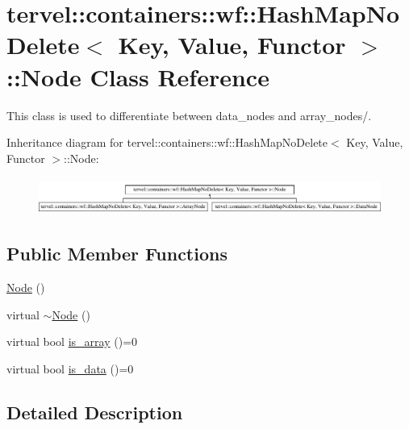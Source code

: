 \hypertarget{classtervel_1_1containers_1_1wf_1_1_hash_map_no_delete_1_1_node}{}\section{tervel\+:\+:containers\+:\+:wf\+:\+:Hash\+Map\+No\+Delete$<$ Key, Value, Functor $>$\+:\+:Node Class Reference}
\label{classtervel_1_1containers_1_1wf_1_1_hash_map_no_delete_1_1_node}


This class is used to differentiate between data\+\_\+nodes and array\+\_\+nodes/.  


Inheritance diagram for tervel\+:\+:containers\+:\+:wf\+:\+:Hash\+Map\+No\+Delete$<$ Key, Value, Functor $>$\+:\+:Node\+:\begin{figure}[H]
\begin{center}
\leavevmode
\includegraphics[height=1.222707cm]{classtervel_1_1containers_1_1wf_1_1_hash_map_no_delete_1_1_node}
\end{center}
\end{figure}
\subsection*{Public Member Functions}
\begin{DoxyCompactItemize}
\item 
\hyperlink{classtervel_1_1containers_1_1wf_1_1_hash_map_no_delete_1_1_node_ad277ea9a398c9bf518b986fdd7efd46e}{Node} ()
\item 
virtual \hyperlink{classtervel_1_1containers_1_1wf_1_1_hash_map_no_delete_1_1_node_a7f65753fac9617b5e9cb072d31131f52}{$\sim$\+Node} ()
\item 
virtual bool \hyperlink{classtervel_1_1containers_1_1wf_1_1_hash_map_no_delete_1_1_node_a551c6b4900b06efe3fc1d4de7c25963b}{is\+\_\+array} ()=0
\item 
virtual bool \hyperlink{classtervel_1_1containers_1_1wf_1_1_hash_map_no_delete_1_1_node_a03ef6395f93104d0313296773be36b3c}{is\+\_\+data} ()=0
\end{DoxyCompactItemize}


\subsection{Detailed Description}
